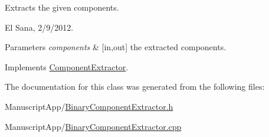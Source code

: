 Extracts the given components. 

El Sana, 2/9/2012. 


\begin{DoxyParams}{Parameters}
{\em components} & \mbox{[}in,out\mbox{]} the extracted components. \\
\hline
\end{DoxyParams}


Implements \hyperlink{class_component_extractor_ac26bd7eec0e6caa7312f603bf2368d84}{Component\+Extractor}.



The documentation for this class was generated from the following files\+:\begin{DoxyCompactItemize}
\item 
Manuscript\+App/\hyperlink{_binary_component_extractor_8h}{Binary\+Component\+Extractor.\+h}\item 
Manuscript\+App/\hyperlink{_binary_component_extractor_8cpp}{Binary\+Component\+Extractor.\+cpp}\end{DoxyCompactItemize}
